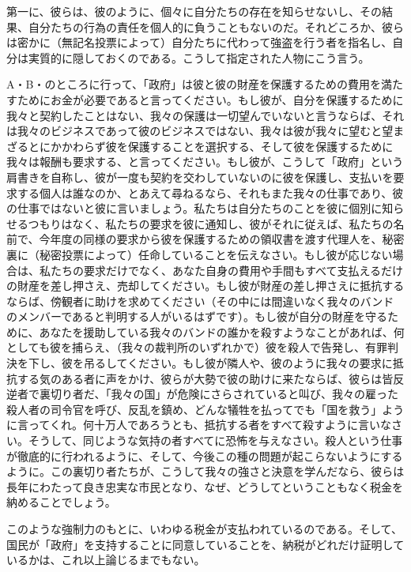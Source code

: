 \documentclass[dvipdfmx, uplatex, tate, landscape]{utbook}
\begin{document}
\begin{enumerate}
第一に、彼らは、彼のように、個々に自分たちの存在を知らせないし、その結果、自分たちの行為の責任を個人的に負うこともないのだ。それどころか、彼らは密かに（無記名投票によって）自分たちに代わって強盗を行う者を指名し、自分は実質的に隠しておくのである。こうして指定された人物にこう言う。

A・B・のところに行って、「政府」は彼と彼の財産を保護するための費用を満たすためにお金が必要であると言ってください。もし彼が、自分を保護するために我々と契約したことはない、我々の保護は一切望んでいないと言うならば、それは我々のビジネスであって彼のビジネスではない、我々は彼が我々に望むと望まざるとにかかわらず彼を保護することを選択する、そして彼を保護するために我々は報酬も要求する、と言ってください。もし彼が、こうして「政府」という肩書きを自称し、彼が一度も契約を交わしていないのに彼を保護し、支払いを要求する個人は誰なのか、とあえて尋ねるなら、それもまた我々の仕事であり、彼の仕事ではないと彼に言いましょう。私たちは自分たちのことを彼に個別に知らせるつもりはなく、私たちの要求を彼に通知し、彼がそれに従えば、私たちの名前で、今年度の同様の要求から彼を保護するための領収書を渡す代理人を、秘密裏に（秘密投票によって）任命していることを伝えなさい。もし彼が応じない場合は、私たちの要求だけでなく、あなた自身の費用や手間もすべて支払えるだけの財産を差し押さえ、売却してください。もし彼が財産の差し押さえに抵抗するならば、傍観者に助けを求めてください（その中には間違いなく我々のバンドのメンバーであると判明する人がいるはずです）。もし彼が自分の財産を守るために、あなたを援助している我々のバンドの誰かを殺すようなことがあれば、何としても彼を捕らえ、（我々の裁判所のいずれかで）彼を殺人で告発し、有罪判決を下し、彼を吊るしてください。もし彼が隣人や、彼のように我々の要求に抵抗する気のある者に声をかけ、彼らが大勢で彼の助けに来たならば、彼らは皆反逆者で裏切り者だ、「我々の国」が危険にさらされていると叫び、我々の雇った殺人者の司令官を呼び、反乱を鎮め、どんな犠牲を払ってでも「国を救う」ように言ってくれ。何十万人であろうとも、抵抗する者をすべて殺すように言いなさい。そうして、同じような気持の者すべてに恐怖を与えなさい。殺人という仕事が徹底的に行われるように、そして、今後この種の問題が起こらないようにするように。この裏切り者たちが、こうして我々の強さと決意を学んだなら、彼らは長年にわたって良き忠実な市民となり、なぜ、どうしてということもなく税金を納めることでしょう。

このような強制力のもとに、いわゆる税金が支払われているのである。そして、国民が「政府」を支持することに同意していることを、納税がどれだけ証明しているかは、これ以上論じるまでもない。


\end{enumerate}
\end{document}
